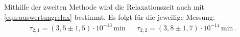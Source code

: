   \noindent
  Mithilfe der zweiten Methode wird die Relaxationszeit auch mit \eqref{eqn:auswertungrelax} bestimmt.
  Es folgt für die jeweilige Messung:
  \begin{align*}
    \tau_{2,1} =  (3,5\pm 1,5)\cdot 10^{-13}\,\si{\minute} &&  \tau_{2,2} = (3,8\pm 1,7)\cdot 10^{-14}\,\si{\minute}\, . \\
  \end{align*}
